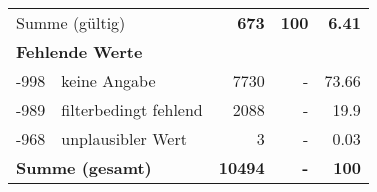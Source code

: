 \begin{longtable}{lXrrr}
     \midrule
     \multicolumn{2}{l}{Summe (gültig)} &
       \textbf{\num{673}} &
     \textbf{100} &
       \textbf{\num[round-mode=places,round-precision=2]{6,41}} \\
     \multicolumn{5}{l}{\textbf{Fehlende Werte}}\\
       -998 &
       keine Angabe &
         \num{7730} &
        - &
         \num[round-mode=places,round-precision=2]{73,66} \\
       -989 &
       filterbedingt fehlend &
         \num{2088} &
        - &
         \num[round-mode=places,round-precision=2]{19,9} \\
       -968 &
       unplausibler Wert &
         \num{3} &
        - &
         \num[round-mode=places,round-precision=2]{0,03} \\
     \midrule
     \multicolumn{2}{l}{\textbf{Summe (gesamt)}} &
          \textbf{\num{10494}} &
        \textbf{-} &
        \textbf{100} \\
     \bottomrule
     \end{longtable}
     
